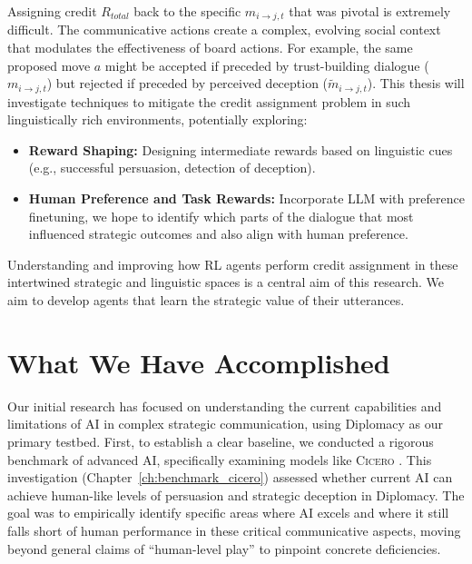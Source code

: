 \documentclass[oneside]{memoir}
\newcommand{\cicero}{\abr{Cicero} }
\newcommand{\abr}[1]{\textsc{#1}}
\begin{document}
Assigning credit $R_{total}$ back to the specific $m_{i \to j,t}$ that was pivotal is extremely difficult. The communicative actions create a complex, evolving social context that modulates the effectiveness of board actions. For example, the same proposed move $a$ might be accepted if preceded by trust-building dialogue ($m_{i \to j, t}$) but rejected if preceded by perceived deception ($\tilde{m}_{i \to j, t}$).
This thesis will investigate techniques to mitigate the credit assignment problem in such linguistically rich environments, potentially exploring:
\begin{itemize}
    \item \textbf{Reward Shaping:} Designing intermediate rewards based on linguistic cues (e.g., successful persuasion, detection of deception).
    \item \textbf{Human Preference and Task Rewards:} Incorporate LLM with preference finetuning, we hope to identify which parts of the dialogue that most influenced strategic outcomes and also align with human preference.
\end{itemize}
Understanding and improving how RL agents perform credit assignment in these intertwined strategic and linguistic spaces is a central aim of this research. We aim to develop agents that learn the strategic value of their utterances.


\section{What We Have Accomplished}
Our initial research has focused on understanding the current capabilities and limitations of AI in complex strategic communication, using Diplomacy as our primary testbed. First, to establish a clear baseline, we conducted a rigorous benchmark of advanced AI, specifically examining models like \cicero. This investigation (Chapter~\ref{ch:benchmark_cicero}) assessed whether current AI can achieve human-like levels of persuasion and strategic deception in Diplomacy. The goal was to empirically identify specific areas where AI excels and where it still falls short of human performance in these critical communicative aspects, moving beyond general claims of ``human-level play'' to pinpoint concrete deficiencies.
\end{document}
